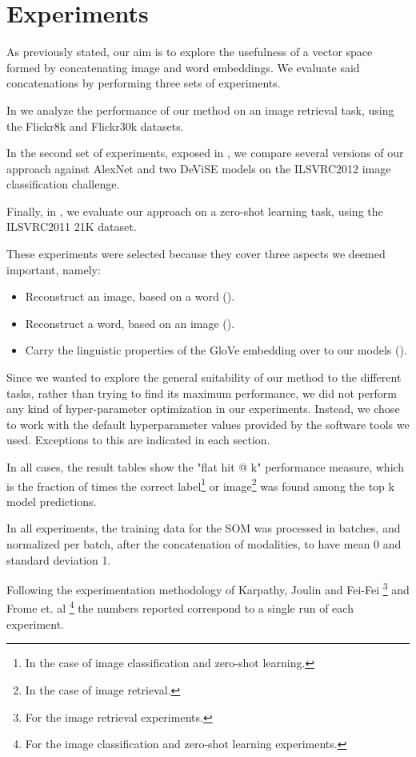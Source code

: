 \documentclass[a4paper]{standalone}
\begin{document}
\chapter{Experiments}\label{chap:experiments}

As previously stated, our aim is to explore the usefulness of a vector space formed by concatenating image and word embeddings.
We evaluate said concatenations by performing three sets of experiments.

In  we analyze the performance of our method on an image retrieval task, using the Flickr8k \cite{hodosh2013framing} and Flickr30k \cite{young2014image} datasets.

In the second set of experiments, exposed in , we compare several versions of our approach against AlexNet and two DeViSE models on the ILSVRC2012  \cite{ILSVRC15} image classification challenge.

Finally, in , we evaluate our approach on a zero-shot learning task, using the ILSVRC2011 21K dataset. 

These experiments were selected because they cover three aspects we deemed important, namely:
\begin{itemize}
    \item Reconstruct an image, based on a word ().
    \item Reconstruct a word, based on an image ().
    \item Carry the linguistic properties of the GloVe embedding over to our models ().
\end{itemize}

Since we wanted to explore the general suitability of our method to the different tasks, rather than trying to find its maximum performance, we did not perform any kind of hyper-parameter optimization in our experiments. Instead, we chose to work with the default hyperparameter values provided by the software tools we used. Exceptions to this are indicated in each section.

In all cases, the result tables show the "flat hit @ k" performance measure, which is the fraction of times the correct label\footnote{In the case of image classification and zero-shot learning.} or image\footnote{In the case of image retrieval.} was found among the top k model predictions.

In all experiments, the training data for the SOM was processed in batches, and normalized per batch, after the concatenation of modalities, to have mean 0 and standard deviation 1.

Following the experimentation methodology of Karpathy, Joulin and Fei-Fei \cite{karpathy2014deep}\footnote{For the image retrieval experiments.} and Frome et. al \cite{frome2013devise}\footnote{For the image classification and zero-shot learning experiments.} the numbers reported correspond to a single run of each experiment.






\end{document}
